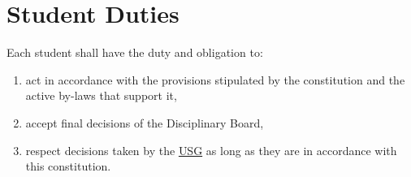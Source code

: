 \section{Student Duties}
Each student shall have the duty and obligation to:
\begin{enumerate}
\item
act in accordance with the provisions stipulated by the constitution and the active by-laws that support it,

\item 
accept final decisions of the Disciplinary Board,

\item
 respect decisions taken by the \hyperref[USGdef]{USG} as long as they are in accordance with this constitution.
\end{enumerate}